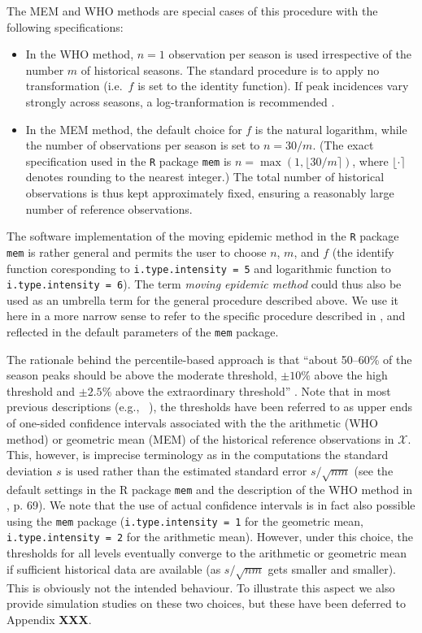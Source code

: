 \documentclass{article}
\newcommand{\sd}{s}
\begin{document}
\noindent The MEM and WHO methods are special cases of this procedure with the following specifications:
\begin{itemize}
\item In the WHO method, $n = 1$ observation per season is used irrespective of the number $m$ of historical seasons. The standard procedure is to apply no transformation (i.e.\ $f$ is set to the identity function). If peak incidences vary strongly across seasons, a log-tranformation is recommended \citep{WHO2017}. 
\item In the MEM method, the default choice for $f$ is the natural logarithm, while the number of observations per season is set to $n = 30/m$. (The exact specification used in the \texttt{R} package \texttt{mem} is $n = \max(1, \lfloor 30/m \rceil)$, where $\lfloor \cdot \rceil$ denotes rounding to the nearest integer.) The total number of historical observations is thus kept approximately fixed, ensuring a reasonably large number of reference observations.
\end{itemize}
The software implementation of the moving epidemic method in the \texttt{R} package \texttt{mem} is rather general and permits the user to choose $n$, $m$, and $f$ (the identify function coresponding to \texttt{i.type.intensity	= 5} and logarithmic function to \texttt{i.type.intensity = 6}). The term \textit{moving epidemic method} could thus also be used as an umbrella term for the general procedure described above. We use it here in a more narrow sense to refer to the specific procedure described in \cite{Vega2015}, \cite{WHO2017} and reflected in the default parameters of the \texttt{mem} package.

The rationale behind the percentile-based approach is that ``about 50--60\% of the season peaks should be above the moderate threshold, $\pm 10\%$ above the high threshold and $\pm 2.5\%$ above the extraordinary threshold'' \citep{WHO2017}. Note that in most previous descriptions (e.g., \ \citealt{WHO2014, Vega2015}), the thresholds have been referred to as upper ends of one-sided confidence intervals associated with the the arithmetic (WHO method) or geometric mean (MEM) of the historical reference observations in $\mathcal{X}$. This, however, is imprecise terminology as in the computations the standard deviation $\sd$ is used rather than the estimated standard error $\sd/\sqrt{nm}$ (see the default settings in the R package \texttt{mem} and the description of the WHO method in \citealt{WHO2014}, p. 69). We note that the use of actual confidence intervals is in fact also possible using the \texttt{mem} package (\texttt{i.type.intensity = 1} for the geometric mean, \texttt{i.type.intensity = 2} for the arithmetic mean). However, under this choice, the thresholds for all levels eventually converge to the arithmetic or geometric mean if sufficient historical data are available (as $\sd/\sqrt{nm}$ gets smaller and smaller). This is obviously not the intended behaviour. To illustrate this aspect we also provide simulation studies on these two choices, but these have been deferred to Appendix \textbf{XXX}.
 
\end{document}
